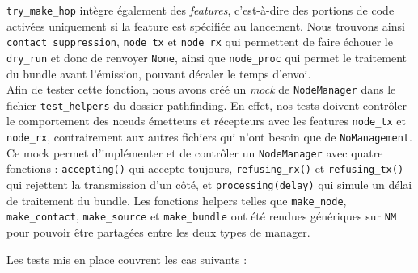 \documentclass{article}
\begin{document}
\texttt{try\_make\_hop} intègre également des \textit{features}, c'est-à-dire des portions de code activées uniquement si la feature est spécifiée au lancement. Nous trouvons ainsi \texttt{contact\_suppression}, \texttt{node\_tx} et \texttt{node\_rx} qui permettent de faire échouer le \texttt{dry\_run} et donc de renvoyer \texttt{None}, ainsi que \texttt{node\_proc} qui permet le traitement du bundle avant l'émission, pouvant décaler le temps d'envoi. \\


Afin de tester cette fonction, nous avons créé un \textit{mock} de \texttt{NodeManager} dans le fichier \texttt{test\_helpers} du dossier pathfinding. En effet, nos tests doivent contrôler le comportement des nœuds émetteurs et récepteurs avec les features \texttt{node\_tx} et \texttt{node\_rx}, contrairement aux autres fichiers qui n'ont besoin que de \texttt{NoManagement}. Ce mock permet d'implémenter et de contrôler un \texttt{NodeManager} avec quatre fonctions : \texttt{accepting()} qui accepte toujours, \texttt{refusing\_rx()} et \texttt{refusing\_tx()} qui rejettent la transmission d'un côté, et \texttt{processing(delay)} qui simule un délai de traitement du bundle. Les fonctions helpers telles que \texttt{make\_node}, \texttt{make\_contact}, \texttt{make\_source} et \texttt{make\_bundle} ont été rendues génériques sur \texttt{NM} pour pouvoir être partagées entre les deux types de manager.

Les tests mis en place couvrent les cas suivants :
\end{document}
